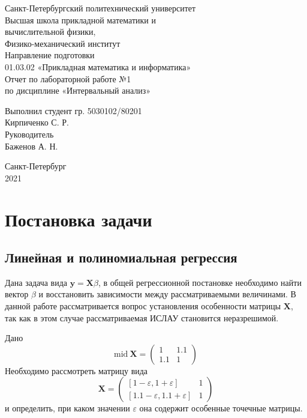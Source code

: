 \documentclass[a4paper]{article}
\begin{document}
\large
\begin{center}
    Санкт-Петербургский политехнический университет\\
    Высшая школа прикладной математики и\\вычислительной физики,\\ 
    Физико-механический институт\\
    \vspace{3em}
    Направление подготовки\\
    01.03.02 «Прикладная математика и информатика»\\
    \vspace{10em}
    \Large
    Отчет по лабораторной работе №1 \\
    по дисциплине «Интервальный анализ»
    \vspace{19em}
    \large
\end{center}
Выполнил студент гр. 5030102/80201\\
Кирпиченко С. Р.\\
Руководитель\\
Баженов А. Н.
\vspace{10em}
\begin{center}
    Санкт-Петербург\\
    2021
\end{center}
\thispagestyle{empty}
\newpage
\tableofcontents
{}
\newpage
\listoffigures
{}
\newpage
\section{Постановка задачи}
\subsection{Линейная и полиномиальная регрессия}
Дана задача вида $\mathbf{y}=\mathbf{X}\beta$, в общей регрессионной постановке необходимо найти вектор $\beta$ и восстановить зависимости между рассматриваемыми величинами. В данной работе рассматривается вопрос установления особенности матрицы $\mathbf{X}$, так как в этом случае рассматриваемая ИСЛАУ становится неразрешимой. 

Дано 
\begin{equation}
    \mathrm{mid}\:\mathbf{X}=\begin{pmatrix}
      1& 1.1\\
      1.1& 1
    \end{pmatrix}
\end{equation}
Необходимо рассмотреть матрицу вида 
\begin{equation}\label{mat:reg}
\mathbf{X}=\begin{pmatrix}
  [1-\varepsilon,1+\varepsilon]& 1\\
  [1.1-\varepsilon,1.1+\varepsilon]& 1
\end{pmatrix}
\end{equation}
и определить, при каком значении $\varepsilon$ она содержит особенные точечные матрицы.
\end{document}
